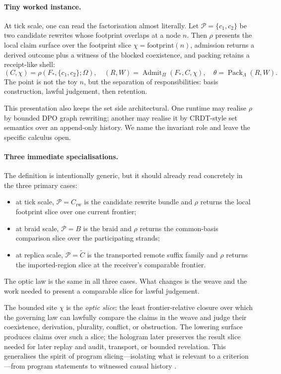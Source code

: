 \documentclass{aion}
\begin{document}
\paragraph{Tiny worked instance.}
At tick scale, one can read the factorisation almost literally. Let
\(\mathcal{P}=\{c_1,c_2\}\) be two candidate rewrites whose footprint overlaps at
a node \(n\). Then \(\rho\) presents the local claim surface over the footprint
slice \(\chi=\mathrm{footprint}(n)\), admission returns a derived outcome plus a
witness of the blocked coexistence, and packing retains a receipt-like shell:
\[
	(C,\chi) = \rho(F_*, \{c_1,c_2\};\Omega),
	\quad
	(R,W)=\operatorname{Admit}_{\Pi}(F_*,C,\chi),
	\quad
	\theta=\operatorname{Pack}_{\Lambda}(R,W).
\]
The point is not the toy \(n\), but the separation of responsibilities: basis
construction, lawful judgement, then retention.

This presentation also keeps the set side architectural. One runtime may
realise \(\rho\) by bounded DPO graph rewriting; another may realise it by
CRDT-style set semantics over an append-only history. We name the invariant
role and leave the specific calculus open.

\paragraph{Three immediate specialisations.}
The definition is intentionally generic, but it should already read
concretely in the three primary cases:
\begin{itemize}[leftmargin=*]
	\item at tick scale, \(\mathcal{P}=C_{\mathrm{rw}}\) is the candidate rewrite
	      bundle and \(\rho\) returns the local footprint slice over one current
	      frontier;
	\item at braid scale, \(\mathcal{P}=B\) is the braid and \(\rho\) returns the
	      common-basis comparison slice over the participating strands;
	\item at replica scale, \(\mathcal{P}=\widetilde{C}\) is the transported
	      remote suffix family and \(\rho\) returns the imported-region slice at the
	      receiver's comparable frontier.
\end{itemize}
The optic law is the same in all three cases. What changes is the weave and the
work needed to present a comparable slice for lawful judgement.

	\begin{definition}
	\label{def:optic-slice}
		The bounded site \(\chi\) is the \emph{optic slice}: the least
		frontier-relative closure over which the governing law can lawfully compare the
		claims in the weave and judge their coexistence, derivation, plurality, conflict, or
		obstruction. The lowering surface produces claims over such a slice; the
		hologram later preserves the result slice needed for later replay and audit,
		transport, or bounded revelation. This generalises the spirit of program slicing---isolating what
		is relevant to a criterion---from program statements to witnessed causal
		history \cite{Weiser1981}.
	\end{definition}
\end{document}
